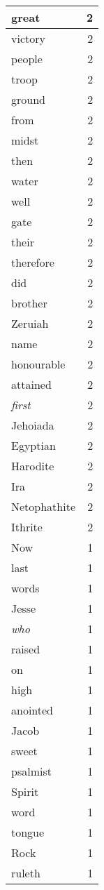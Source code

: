 \begin{center}
\begin{longtable}{l|r}
great & 2 \\ \hline
victory & 2 \\ \hline
people & 2 \\ \hline
troop & 2 \\ \hline
ground & 2 \\ \hline
from & 2 \\ \hline
midst & 2 \\ \hline
then & 2 \\ \hline
water & 2 \\ \hline
well & 2 \\ \hline
gate & 2 \\ \hline
their & 2 \\ \hline
therefore & 2 \\ \hline
did & 2 \\ \hline
brother & 2 \\ \hline
Zeruiah & 2 \\ \hline
name & 2 \\ \hline
honourable & 2 \\ \hline
attained & 2 \\ \hline
\emph{first} & 2 \\ \hline
Jehoiada & 2 \\ \hline
Egyptian & 2 \\ \hline
Harodite & 2 \\ \hline
Ira & 2 \\ \hline
Netophathite & 2 \\ \hline
Ithrite & 2 \\ \hline
Now & 1 \\ \hline
last & 1 \\ \hline
words & 1 \\ \hline
Jesse & 1 \\ \hline
\emph{who} & 1 \\ \hline
raised & 1 \\ \hline
on & 1 \\ \hline
high & 1 \\ \hline
anointed & 1 \\ \hline
Jacob & 1 \\ \hline
sweet & 1 \\ \hline
psalmist & 1 \\ \hline
Spirit & 1 \\ \hline
word & 1 \\ \hline
tongue & 1 \\ \hline
Rock & 1 \\ \hline
ruleth & 1 \\ \hline

\end{longtable}
\end{center}
